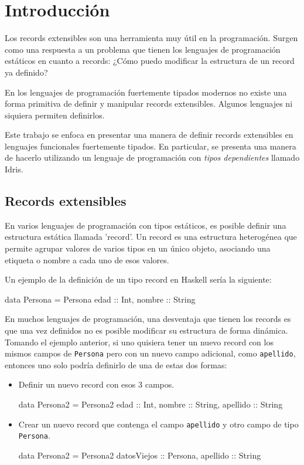 
\chapter{Introducción}
\label{ch:1}

Los records extensibles son una herramienta muy útil en la programación. Surgen como una respuesta a un problema que tienen los lenguajes de programación estáticos en cuanto a records: ¿Cómo puedo modificar la estructura de un record ya definido?

En los lenguajes de programación fuertemente tipados modernos no existe una forma primitiva de definir y manipular records extensibles. Algunos lenguajes ni siquiera permiten definirlos.

Este trabajo se enfoca en presentar una manera de definir records extensibles en lenguajes funcionales fuertemente tipados. En particular, se presenta una manera de hacerlo utilizando un lenguaje de programación con \textit{tipos dependientes} llamado Idris.

\section{Records extensibles}

En varios lenguajes de programación con tipos estáticos, es posible definir una estructura estática llamada 'record'. Un record es una estructura heterogénea que permite agrupar valores de varios tipos en un único objeto, asociando una etiqueta o nombre a cada uno de esos valores.

Un ejemplo de la definición de un tipo record en Haskell sería la siguiente:

\begin{code}
data Persona = Persona { edad :: Int, nombre :: String }
\end{code}

En muchos lenguajes de programación, una desventaja que tienen los records es que una vez definidos no es posible modificar su estructura de forma dinámica. Tomando el ejemplo anterior, si uno quisiera tener un nuevo record con los mismos campos de \texttt{Persona} pero con un nuevo campo adicional, como \texttt{apellido}, entonces uno solo podría definirlo de una de estas dos formas:

\begin{itemize}[noitemsep]
\item Definir un nuevo record con esos 3 campos.
\begin{code}
data Persona2 = Persona2 {
  edad :: Int,
  nombre :: String,
  apellido :: String
}
\end{code}
\item Crear un nuevo record que contenga el campo \texttt{apellido} y otro campo de tipo \texttt{Persona}.
\begin{code}
data Persona2 = Persona2 {
  datosViejos :: Persona,
  apellido :: String
}
\end{code}
\end{itemize}

